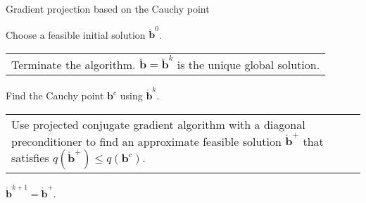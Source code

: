 \documentclass[twocolumn]{svjour3}
\makeatletter
\newcommand{\multiline}[1]{%
	\begin{tabularx}{\dimexpr\linewidth-\ALG@thistlm}[t]{@{}X@{}}
		#1
	\end{tabularx}
}
\makeatother
\begin{document}
\begin{algorithm}
	\caption{Gradient projection based on the Cauchy point}
	\label{alg:gradproj}
	\begin{spacing}{1.3}
		\begin{algorithmic}[1]
			\Require Choose a feasible initial solution $\mathring{\bm{b}}^{0}$.
			\State \multiline{Terminate the algorithm. $\breve{\bm{b}} = \mathring{\bm{b}}^{k}$ is the unique global solution.}
			\Else {}
			\State Find the Cauchy point $\bm{b}^{c}$ using $\mathring{\bm{b}}^{k}$.
			\State \multiline{Use projected conjugate gradient algorithm with a diagonal preconditioner to find an approximate feasible solution $\mathring{\bm{b}}^{+}$ that satisfies $q(\mathring{\bm{b}}^{+}) \leq q(\bm{b}^{c})$.}
			\State $\mathring{\bm{b}}^{k+1} = \mathring{\bm{b}}^{+}$.
			\EndIf
			\EndFor
		\end{algorithmic}
	\end{spacing}
\end{algorithm}
\end{document}
